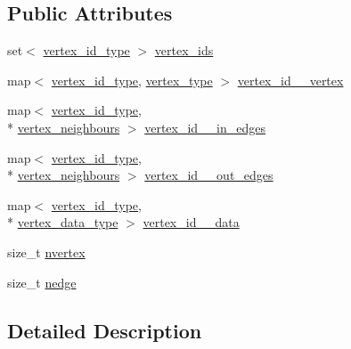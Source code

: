 \subsection*{Public Attributes}
\begin{DoxyCompactItemize}
\item 
set$<$ \hyperlink{classsaedb_1_1sae__graph_a2f9a7bf2db556689f1cd9de9562ff41f}{vertex\-\_\-id\-\_\-type} $>$ \hyperlink{classsaedb_1_1sae__graph_a2ccc2ab5b2a101c3a1c323d24ebc8575}{vertex\-\_\-ids}
\item 
map$<$ \hyperlink{classsaedb_1_1sae__graph_a2f9a7bf2db556689f1cd9de9562ff41f}{vertex\-\_\-id\-\_\-type}, \hyperlink{structsaedb_1_1sae__graph_1_1vertex__type}{vertex\-\_\-type} $>$ \hyperlink{classsaedb_1_1sae__graph_a48eea89cb33990272507f967d5116216}{vertex\-\_\-id\-\_\-\_\-vertex}
\item 
map$<$ \hyperlink{classsaedb_1_1sae__graph_a2f9a7bf2db556689f1cd9de9562ff41f}{vertex\-\_\-id\-\_\-type}, \\*
\hyperlink{classsaedb_1_1sae__graph_aabe2a7d32910210e6b72c35412adbd1e}{vertex\-\_\-neighbours} $>$ \hyperlink{classsaedb_1_1sae__graph_a29465e678178961ca52a3887cec29062}{vertex\-\_\-id\-\_\-\_\-in\-\_\-edges}
\item 
map$<$ \hyperlink{classsaedb_1_1sae__graph_a2f9a7bf2db556689f1cd9de9562ff41f}{vertex\-\_\-id\-\_\-type}, \\*
\hyperlink{classsaedb_1_1sae__graph_aabe2a7d32910210e6b72c35412adbd1e}{vertex\-\_\-neighbours} $>$ \hyperlink{classsaedb_1_1sae__graph_ad04eb3952dbc00e6cbe3f2638eb2c2bf}{vertex\-\_\-id\-\_\-\_\-out\-\_\-edges}
\item 
map$<$ \hyperlink{classsaedb_1_1sae__graph_a2f9a7bf2db556689f1cd9de9562ff41f}{vertex\-\_\-id\-\_\-type}, \\*
\hyperlink{classsaedb_1_1sae__graph_a8e9dfeb979f49c35d427f364fb3f69f5}{vertex\-\_\-data\-\_\-type} $>$ \hyperlink{classsaedb_1_1sae__graph_a62ce6b48cf14e233f705b232b374fe27}{vertex\-\_\-id\-\_\-\_\-data}
\item 
size\-\_\-t \hyperlink{classsaedb_1_1sae__graph_a06ee4411cd8c4c9352bbe111526e23bc}{nvertex}
\item 
size\-\_\-t \hyperlink{classsaedb_1_1sae__graph_a0f438dbda72b5762b72c444c5655e9e2}{nedge}
\end{DoxyCompactItemize}


\subsection{Detailed Description}

